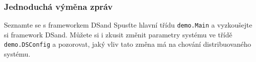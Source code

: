 \documentclass[usenames,dvipsnames,9pt]{beamer}
\begin{document}
\begin{frame}
\begin{center}
  \end{center}
  \vspace{-0.5em}
  {\small{}}
\end{frame}

{
\begin{frame}[fragile]
\frametitle{Jednoduchá výměna zpráv}

  \begin{block}{Seznamte se s frameworkem DSand}
    Spusťte hlavní třídu \texttt{demo.Main} a vyzkoušejte si framework DSand.
    Můžete si i zkusit změnit parametry systému ve třídě \texttt{demo.DSConfig} a pozorovat, jaký vliv tato změna má na chování distribuovaného systému.
  \end{block}

\end{frame}
}
\end{document}
